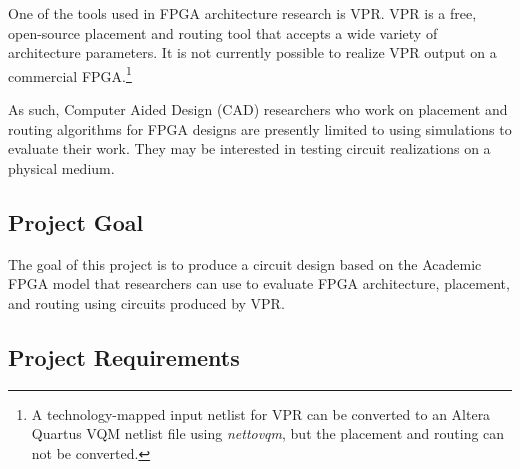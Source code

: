 One of the tools used in FPGA architecture research is VPR.
VPR is a free, open-source placement and routing tool that accepts a wide variety of architecture parameters. \citationneeded
It is not currently possible to realize VPR output on a commercial FPGA.\footnote{A technology-mapped input netlist for VPR can be converted to an Altera Quartus VQM netlist file using \emph{nettovqm}\cite{nettovqm}, but the placement and routing can not be converted.}

As such, Computer Aided Design (CAD) researchers who work on placement and routing algorithms for FPGA designs are presently limited to using simulations to evaluate their work.
They may be interested in testing circuit realizations on a physical medium.



\subsection{Project Goal}

% 

The goal of this project is to produce a circuit design based on the Academic FPGA model that researchers can use to evaluate FPGA architecture, placement, and routing using circuits produced by VPR.



\subsection{Project Requirements}

